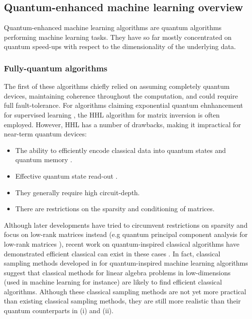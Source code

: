 \documentclass[twocolumn, aps, rmp, amsmath, amssymb, nofootinbib, superscriptaddress, longbibliography, floatfix, table-of-contents, eqsecnum]{revtex4}
\begin{document}
\subsection{Quantum-enhanced machine learning overview}

Quantum-enhanced machine learning algorithms are quantum algorithms performing machine learning tasks. They have so far mostly concentrated on quantum speed-ups with respect to the dimensionality of the underlying data.

\subsubsection{Fully-quantum algorithms}

The first of these algorithms chiefly relied on assuming completely quantum devices, maintaining coherence throughout the computation, and could require full fault-tolerance. For algorithms claiming exponential quantum ehnhancement for supervised learning \cite{biamonte2017quantum, ciliberto2018quantum}, the HHL algorithm \cite{harrow2009quantum} for matrix inversion is often employed. However, HHL has a number of drawbacks, making it impractical for near-term quantum devices:
\begin{itemize}
\item The ability to efficiently encode classical data into quantum states and quantum memory \cite{aaronson2015read}.
\item Effective quantum state read-out \cite{aaronson2015read}.
\item They generally require high circuit-depth.
\item There are restrictions on the sparsity and conditioning of matrices.
\end{itemize}


Although later developments have tried to circumvent restrictions on sparsity and focus on low-rank matrices instead (e.g quantum principal component analysis for low-rank matrices \cite{lloyd2014quantum}), recent work on quantum-inspired classical algorithms have demonstrated efficient classical can exist in these cases \cite{tang2018quantum, gilyen2018quantum, chia2018quantum}. In fact, classical sampling methods developed in \cite{tang2018quantum} for quantum-inspired machine learning algorithms suggest that classical methods for linear algebra problems in low-dimensions (used in machine learning for instance) are likely to find efficient classical algorithms. Although these classical sampling methods are not yet more practical than existing classical sampling methods, they are still more realistic than their quantum counterparts in (i) and (ii).
\end{document}
